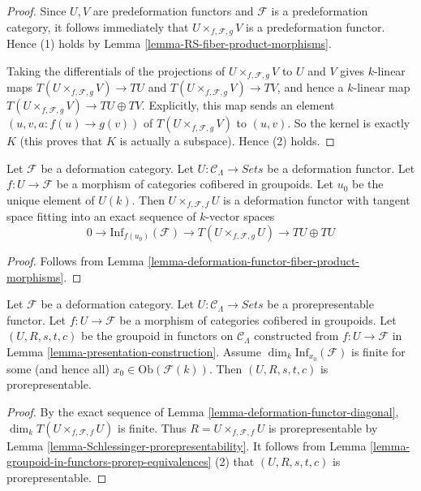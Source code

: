 \begin{proof}
Since $U,V$ are predeformation functors and $\mathcal{F}$ is a predeformation 
category, it follows immediately that $U \times_{f, \mathcal{F}, g} V$ is a 
predeformation functor.  Hence (1) holds by Lemma 
\ref{lemma-RS-fiber-product-morphisms}.

\medskip \noindent
Taking the differentials of the projections of $U \times_{f, \mathcal{F}, g} V$ 
to $U$ and $V$ gives $k$-linear maps $T(U \times_{f, \mathcal{F}, g} V) 
\to TU$ and $T(U \times_{f, \mathcal{F}, g} V) \to TV$, and 
hence a $k$-linear map $T(U \times_{f, \mathcal{F}, g} V) \to TU \oplus 
TV$.  Explicitly, this map sends an element $(u,v,a: f(u) \to g(v))$ of 
$T(U \times_{f, \mathcal{F}, g} V)$ to $(u,v)$.  So the kernel is exactly $K$ 
(this proves that $K$ is actually a subspace). Hence (2) holds.
\end{proof}

\begin{lemma}
\label{lemma-deformation-functor-diagonal}
Let $\mathcal{F}$ be a deformation category.  Let $U: \mathcal{C}_\Lambda 
\to \textit{Sets}$ be a deformation functor.  Let $f: U 
\to \mathcal{F}$ be a morphism of categories cofibered in groupoids. Let 
$u_0$ be the unique element of $U(k)$.  Then $U \times_{f,\mathcal{F},f} U$ is
a deformation functor with tangent space fitting into an exact sequence of 
$k$-vector spaces
\[ 
0 \to \text{Inf}_{f(u_0)}(\mathcal{F}) \to T(U \times_{f, 
\mathcal{F}, g} U) \to TU \oplus TU 
\]
\end{lemma}

\begin{proof}
Follows from Lemma \ref{lemma-deformation-functor-fiber-product-morphisms}.
\end{proof}

\begin{lemma}
\label{lemma-prorepresentable-groupoid-in-functors-construction}
Let $\mathcal{F}$ be a deformation category.  Let $U: \mathcal{C}_\Lambda 
\to \textit{Sets}$ be a prorepresentable functor.  Let $f: U 
\to \mathcal{F}$ be a morphism of categories cofibered in groupoids.  
Let $(U,R,s,t,c)$ be the groupoid in functors on $\mathcal{C}_\Lambda$ 
constructed from $f: U \to \mathcal{F}$ in Lemma 
\ref{lemma-presentation-construction}. Assume $\dim_{k} 
\text{Inf}_{x_0}(\mathcal{F})$ is finite for some (and hence all) $x_0 \in 
\text{Ob}(\mathcal{F}(k))$.  Then  $(U,R,s,t,c)$ is prorepresentable.
\end{lemma}

\begin{proof}
By the exact sequence of Lemma \ref{lemma-deformation-functor-diagonal}, 
$\dim_{k} T(U \times_{f,\mathcal{F},f} U)$ is finite.  Thus $R =U 
\times_{f,\mathcal{F},f} U$ is prorepresentable by Lemma 
\ref{lemma-Schlessinger-prorepresentability}. It follows from Lemma 
\ref{lemma-groupoid-in-functors-prorep-equivalences} (2) that $(U,R,s,t,c)$ is 
prorepresentable.
\end{proof}

